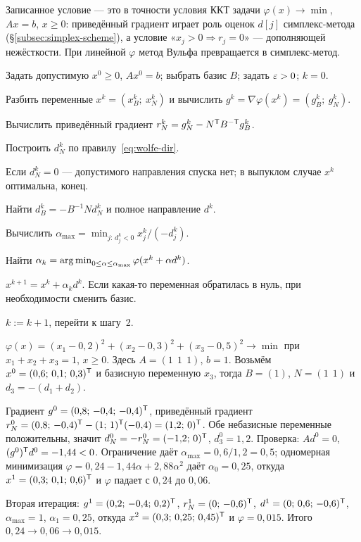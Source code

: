 \begin{idea}
Записанное условие — это в точности условия ККТ задачи
$\varphi(x) \to \min$, $Ax = b$, $x \ge 0$: приведённый градиент играет роль
оценок $d[j]$ симплекс-метода (\S\ref{subsec:simplex-scheme}), а условие
«$x_j > 0 \Rightarrow r_j = 0$» — дополняющей нежёсткости. При линейной
$\varphi$ метод Вульфа превращается в симплекс-метод.
\end{idea}

\begin{algo}[title={Метод приведённого градиента Вульфа}]
\begin{steps}
  \item Задать допустимую $x^0 \ge 0$, $Ax^0 = b$; выбрать базис $B$; задать
        $\varepsilon > 0$; $k = 0$.
  \item Разбить переменные $x^k = (x_B^k;\ x_N^k)$ и вычислить
        $g^k = \nabla\varphi(x^k) = (g_B^k;\ g_N^k)$.
  \item Вычислить приведённый градиент
        $r_N^k = g_N^k - N^{\mathsf{T}} B^{-\mathsf T} g_B^k$.
  \item Построить $d_N^k$ по правилу~\eqref{eq:wolfe-dir}.
  \item Если $d_N^k = 0$ — допустимого направления спуска нет; в выпуклом
        случае $x^k$ оптимальна, конец.
  \item Найти $d_B^k = -B^{-1}N d_N^k$ и полное направление $d^k$.
  \item Вычислить $\alpha_{\max} = \min_{j:\,d_j^k<0} x_j^k / (-d_j^k)$.
  \item Найти $\alpha_k = \operatorname*{arg\,min}_{0 \le \alpha \le \alpha_{\max}}
        \varphi(x^k + \alpha d^k)$.
  \item $x^{k+1} = x^k + \alpha_k d^k$. Если какая-то переменная обратилась в
        нуль, при необходимости сменить базис.
  \item $k := k+1$, перейти к шагу~2.
\end{steps}
\end{algo}

\begin{example}
$\varphi(x) = (x_1-0{,}2)^2 + (x_2-0{,}3)^2 + (x_3-0{,}5)^2 \to \min$ при
$x_1+x_2+x_3 = 1$, $x \ge 0$. Здесь $A = (1\ \ 1\ \ 1)$, $b = 1$. Возьмём
$x^0 = (0{,}6;\,0{,}1;\,0{,}3)^{\mathsf{T}}$ и базисную переменную $x_3$, тогда $B = (1)$,
$N = (1\ \ 1)$ и $d_3 = -(d_1 + d_2)$.

Градиент $g^0 = (0{,}8;\,-0{,}4;\,-0{,}4)^{\mathsf{T}}$, приведённый градиент
$r_N^0 = (0{,}8;\,-0{,}4)^{\mathsf{T}} - (1;\,1)^{\mathsf{T}}(-0{,}4) = (1{,}2;\,0)^{\mathsf{T}}$. Обе небазисные
переменные положительны, значит $d_N^0 = -r_N^0 = (-1{,}2;\,0)^{\mathsf{T}}$,
$d_3^0 = 1{,}2$. Проверка: $Ad^0 = 0$, $(g^0)^{\mathsf{T}} d^0 = -1{,}44 < 0$.
Ограничение даёт $\alpha_{\max} = 0{,}6/1{,}2 = 0{,}5$; одномерная минимизация
$\varphi = 0{,}24 - 1{,}44\alpha + 2{,}88\alpha^2$ даёт $\alpha_0 = 0{,}25$,
откуда $x^1 = (0{,}3;\,0{,}1;\,0{,}6)^{\mathsf{T}}$ и $\varphi$ падает с $0{,}24$ до
$0{,}06$.

Вторая итерация: $g^1 = (0{,}2;\,-0{,}4;\,0{,}2)^{\mathsf{T}}$,
$r_N^1 = (0;\,-0{,}6)^{\mathsf{T}}$, $d^1 = (0;\,0{,}6;\,-0{,}6)^{\mathsf{T}}$,
$\alpha_{\max} = 1$, $\alpha_1 = 0{,}25$, откуда
$x^2 = (0{,}3;\,0{,}25;\,0{,}45)^{\mathsf{T}}$ и $\varphi = 0{,}015$. Итого
$0{,}24 \to 0{,}06 \to 0{,}015$.
\end{example}
